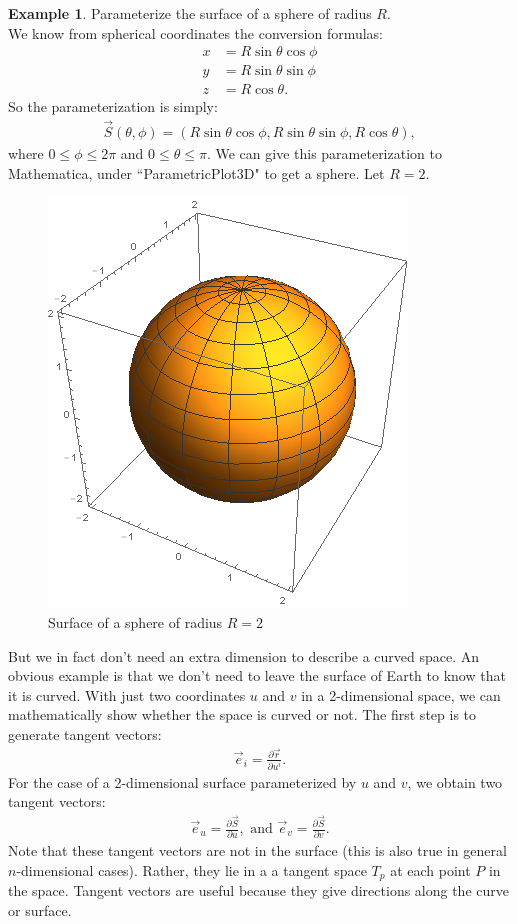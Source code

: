 \documentclass{book}
\theoremstyle{definition}
\newtheorem{exmp}{Example}[section]
\begin{document}
\begin{exmp}
	Parameterize the surface of a sphere of radius $R$.\\
	
	We know from spherical coordinates the conversion formulas:
	\begin{align*}
	x &= R\sin\theta\cos\phi\\
	y &= R\sin\theta\sin\phi\\
	z &= R\cos\theta.
	\end{align*}
	So the parameterization is simply:
	\begin{align*}
	\vec{S}(\theta, \phi) = (R\sin\theta\cos\phi, R\sin\theta\sin\phi, R\cos\theta),
	\end{align*}
	where $0 \leq \phi \leq 2\pi$ and $0\leq \theta \leq \pi$. We can give this parameterization to Mathematica, under ``ParametricPlot3D" to get a sphere. Let $R=2$.
	\begin{figure}[h!]
		\centering
		\includegraphics[scale=0.5]{gr-fig-15.png}
		\caption{Surface of a sphere of radius $R=2$}
	\end{figure}
\end{exmp}
But we in fact don't need an extra dimension to describe a curved space. An obvious example is that we don't need to leave the surface of Earth to know that it is curved. With just two coordinates $u$ and $v$ in a 2-dimensional space, we can mathematically show whether the space is curved or not. The first step is to generate tangent vectors:
\begin{align*}
\vec{e}_i = \frac{\partial \vec{r}}{\partial u^i}.
\end{align*} 
For the case of a 2-dimensional surface parameterized by $u$ and $v$, we obtain two tangent vectors:
\begin{align*}
\vec{e}_u = \frac{\partial \vec{S}}{\partial u}, \text{ and } \vec{e}_v = \frac{\partial \vec{S}}{\partial v}.
\end{align*}
Note that these tangent vectors are not in the surface (this is also true in general $n$-dimensional cases). Rather, they lie in a a tangent space $T_p$ at each point $P$ in the space. Tangent vectors are useful because they give directions along the curve or surface.\\
\end{document}

